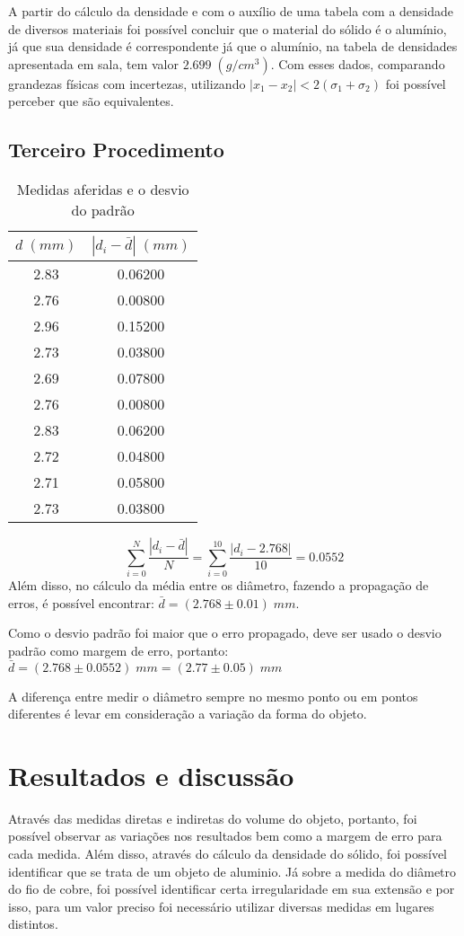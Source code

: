 \documentclass{article}
\begin{document}
A partir do cálculo da densidade e com o auxílio de uma tabela com a densidade de diversos materiais foi possível concluir que o material do sólido é o alumínio, já que sua densidade é correspondente já que o alumínio, na tabela de densidades apresentada em sala, tem valor $2.699\;(g/cm^3)$. Com esses dados, comparando grandezas físicas com incertezas, utilizando $|x_1-x_2|<2(\sigma_1+\sigma_2)$ foi possível perceber que são equivalentes.
\subsection{Terceiro Procedimento}

\begin{table}[!ht]
	\centering
	\begin{tabular}{c|c}
		$d\;(mm)$ & $|d_i-\bar{d}|\;(mm)$ \\\hline
		2.83 & 0.06200\\
		2.76 & 0.00800\\
		2.96 & 0.15200\\
		2.73 & 0.03800\\
		2.69 & 0.07800\\
		2.76 & 0.00800\\
		2.83 & 0.06200\\
		2.72 & 0.04800\\
		2.71 & 0.05800\\
		2.73 & 0.03800\\
	\end{tabular}
	\caption{Medidas aferidas e o desvio do padrão}
	\label{tab:my_label}
\end{table}
\[\sum_{i=0}^N \frac{|d_i-\bar{d}|}{N}=\sum_{i=0}^{10} \frac{|d_i-2.768|}{10}=0.0552\]
\indent
Além disso, no cálculo da média entre os diâmetro, fazendo a propagação de erros, é possível encontrar: $\bar{d} = (2.768 \pm 0.01)\;mm$.

Como o desvio padrão foi maior que o erro propagado, deve ser usado o desvio padrão como margem de erro, portanto: $\bar{d} = (2.768 \pm 0.0552)\;mm = (2.77 \pm 0.05)\;mm$

A diferença entre medir o diâmetro sempre no mesmo ponto ou em pontos diferentes é levar em consideração a variação da forma do objeto.

\section{Resultados e discussão}

\indent

Através das medidas diretas e indiretas do volume do objeto, portanto, foi possível observar as variações nos resultados bem como a margem de erro para cada medida. Além disso, através do cálculo da densidade do sólido, foi possível identificar que se trata de um objeto de aluminio. Já sobre a medida do diâmetro do fio de cobre, foi possível identificar certa irregularidade em sua extensão e por isso, para um valor preciso foi necessário utilizar diversas medidas em lugares distintos.
\end{document}
